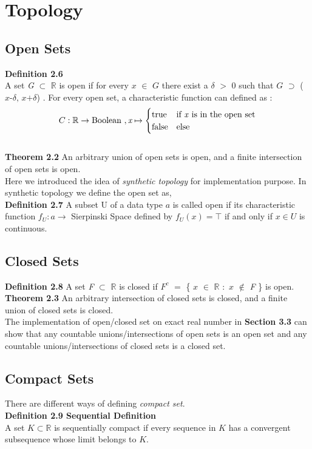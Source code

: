 \documentclass[12pt,twoside,notitlepage]{report}
\begin{document}
\section {Topology}
\subsection {Open Sets}
\textbf{Definition 2.6} \cite{john}\\
A set \textit{G} $\subset$ $\mathbb{R}$ is open if for every $\textit {x}$ $\in$ $\textit {G}$ there exist a $\delta$ $>$ 0 such that $\textit {G}$ $\supset$ ($\textit {x-$\delta$, x+$\delta$}$) . For every open set, a characteristic function can defined as :
\begin{equation}
C : \mathbb{R} \rightarrow \mbox{Boolean },
\textit{x} \mapsto 
\begin{cases}
\text{true}& \text{if \textit{x} is in the open set}\\
\text{false}& \text{else}
\end{cases}
\end{equation}\\
\textbf{Theorem 2.2} An arbitrary union of open sets is open, and a finite intersection of open sets is open.\\
Here we introduced the idea of \emph{synthetic topology} \cite{escardo} for implementation purpose. In synthetic topology we define the open set as,\\
\textbf{Definition 2.7} \cite{escardo} A subset U of a data type $a$ is called open if its characteristic function $f_U : a \to$ Sierpinski Space defined by $f_U(x) = \top$ if and only if $x \in U$ is continuous. 

\subsection {Closed Sets}
\textbf{Definition 2.8} A set \textit{F} $\subset$ $\mathbb{R}$ is closed if $\textit{F} ^{c}$ $=$ \{ $\textit {x}$ $\in$ $\mathbb{R}$ $:$ $\textit {x}$ $\notin$  \textit{F} \} is open. \\
\textbf{Theorem 2.3} An arbitrary intersection of closed sets is closed, and a finite union of closed sets is closed.\\
The implementation of open/closed set on exact real number in \textbf{Section 3.3} can show that any countable unions/intersections of open sets is an open set and any countable unions/intersections of closed sets is a closed set.
 
\subsection {Compact Sets}
There are different ways of defining \emph{compact set}.\\
\textbf{Definition 2.9 Sequential Definition} \cite{john}\\
A set $K \subset \mathbb{R}$ is sequentially compact if every sequence in $K$ has a convergent subsequence whose limit belongs to $K$.\\
\end{document}
